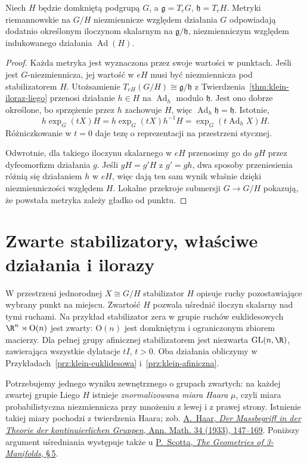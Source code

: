 \begin{stwierdzenie}
\label{prop:klein-metryka-niezmiennicza}
Niech $H$ będzie domkniętą podgrupą $G$, a
$\mathfrak g=T_eG$, $\mathfrak h=T_eH$. Metryki riemannowskie
na $G/H$ niezmiennicze względem działania $G$ odpowiadają
dodatnio określonym iloczynom skalarnym na
$\mathfrak g/\mathfrak h$, niezmienniczym względem
indukowanego działania $\operatorname{Ad}(H)$.
\end{stwierdzenie}
\begin{proof}
Każda metryka jest wyznaczona przez swoje wartości w punktach.
Jeśli jest $G$-niezmiennicza, jej wartość w $eH$ musi być
niezmiennicza pod stabilizatorem $H$. Utożsamienie
$T_{eH}(G/H)\cong\mathfrak g/\mathfrak h$ z
Twierdzenia~\ref{thm:klein-iloraz-liego} przenosi działanie
$h\in H$ na $\operatorname{Ad}_h$ modulo $\mathfrak h$.
Jest ono dobrze określone, bo sprzężenie przez $h$
zachowuje $H$, więc $\operatorname{Ad}_h\mathfrak h=\mathfrak h$.
Istotnie,
\[
 h\exp_G(tX)H
 =h\exp_G(tX)h^{-1}H
 =\exp_G(t\operatorname{Ad}_hX)H.
\]
Różniczkowanie w $t=0$ daje tezę o reprezentacji na
przestrzeni stycznej.

Odwrotnie, dla takiego iloczynu skalarnego w $eH$
przenosimy go do $gH$ przez dyfeomorfizm działania $g$.
Jeśli $gH=g'H$ z $g'=gh$, dwa sposoby przeniesienia
różnią się działaniem $h$ w $eH$, więc dają ten sam wynik
właśnie dzięki niezmienniczości względem $H$.
Lokalne przekroje submersji $G\to G/H$ pokazują, że
powstała metryka zależy gładko od punktu.
\end{proof}

\section{Zwarte stabilizatory, właściwe działania i ilorazy}
\label{sec:klein-zwarte-stabilizatory}

W przestrzeni jednorodnej $X\cong G/H$ stabilizator $H$
opisuje ruchy pozostawiające wybrany punkt na miejscu.
Zwartość $H$ pozwala uśrednić iloczyn skalarny nad tymi ruchami.
Na przykład stabilizator zera w grupie ruchów euklidesowych
$\R^n\rtimes\mathrm O(n)$ jest zwarty: $\mathrm O(n)$ jest
domkniętym i ograniczonym zbiorem macierzy. Dla pełnej grupy
afinicznej stabilizatorem jest niezwarta $\mathrm{GL}(n,\R)$,
zawierająca wszystkie dylatacje $tI$, $t>0$.
Oba działania obliczymy w
Przykładach~\ref{prz:klein-euklidesowa}
i~\ref{prz:klein-afiniczna}.

Potrzebujemy jednego wyniku zewnętrznego o grupach zwartych:
na każdej zwartej grupie Liego $H$ istnieje \emph{znormalizowana
miara Haara} $\mu$, czyli miara probabilistyczna niezmiennicza
przy mnożeniu z lewej i z prawej strony. Istnienie takiej miary
pochodzi z twierdzenia Haara; zob.
\href{https://doi.org/10.2307/1968346}
{A.\ Haar, \emph{Der Massbegriff in der Theorie der kontinuierlichen
Gruppen}, Ann. Math. 34 (1933), 147--169}.
Poniższy argument uśredniania występuje także u
\href{https://sschleimer.warwick.ac.uk/Teach/2021_3MFDS/References/1983the_geometries_of_three-manifolds.pdf}
{P.\ Scotta, \emph{The Geometries of 3-Manifolds}, \S\,5}.

